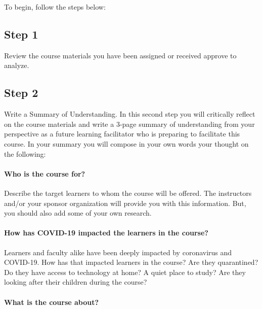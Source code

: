 \documentclass[
]{book}
\begin{document}
To begin, follow the steps below:

\hypertarget{step-1}{%
\subsection{Step 1}\label{step-1}}

Review the course materials you have been assigned or received approve to analyze.

\hypertarget{step-2}{%
\subsection{Step 2}\label{step-2}}

Write a Summary of Understanding. In this second step you will critically reflect on the course materials and write a 3-page summary of understanding from your perspective as a future learning facilitator who is preparing to facilitate this course. In your summary you will compose in your own words your thought on the following:

\hypertarget{who-is-the-course-for}{%
\paragraph{Who is the course for?}\label{who-is-the-course-for}}

Describe the target learners to whom the course will be offered. The instructors and/or your sponsor organization will provide you with this information. But, you should also add some of your own research.

\hypertarget{how-has-covid-19-impacted-the-learners-in-the-course}{%
\paragraph{How has COVID-19 impacted the learners in the course?}\label{how-has-covid-19-impacted-the-learners-in-the-course}}

Learners and faculty alike have been deeply impacted by coronavirus and COVID-19. How has that impacted learners in the course? Are they quarantined? Do they have access to technology at home? A quiet place to study? Are they looking after their children during the course?

\hypertarget{what-is-the-course-about}{%
\paragraph{What is the course about?}\label{what-is-the-course-about}}
\end{document}
